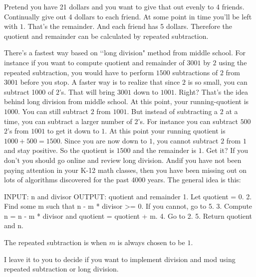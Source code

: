 Pretend you have 21 dollars and you want to give that out evenly to 4 friends.
Continually give out 4 dollars to each friend.
At some point in time you'll be left with $1$. That's the remainder.
And each friend has 5 dollars.
Therefore the quotient and remainder can be calculated
by repeated subtraction.

There's a fastest way based on \lq\lq long division" method from middle
school.
For instance if you want to compute quotient and remainder of
$3001$ by $2$ using the repeated subtraction, you would have to perform
$1500$ subtractions of $2$ from $3001$ before you stop.
A faster way is to realize that since $2$ is so small, you can
subtract 1000 of $2$'s.
That will bring $3001$ down to $1001$. Right?
That's the idea behind long division from middle school.
At this point, your running-quotient is $1000$.
You can still subtract $2$ from $1001$.
But instead of subtracting a $2$ at a time, you can subtract a larger
number of $2$'s.
For instance you can subtract $500$ $2$'s from $1001$
to get it down to $1$.
At this point your running quotient is $1000 + 500 = 1500$.
Since you are now down to $1$, you cannot subtract $2$ from $1$ and stay
positive.
So the quotient is $1500$ and the remainder is $1$.
Get it?
If you don't you should go online and review long division.
Andif you have not been paying attention in your K-12 math classes, then you
have been missing out on lots of algorithms discovered for the past 4000 years.
The general idea is this:
\begin{console}[fontsize=\footnotesize]
INPUT: n and divisor
OUTPUT: quotient and remainder
1. Let quotient = 0.
2. Find some m such that n - m * divisor >= 0. If you cannot, go to 5.
3. Compute n = n - m * divisor and quotient = quotient + m.
4. Go to 2.
5. Return quotient and n.
\end{console}
The repeated subtraction is when $m$ is always chosen to be $1$.

I leave it to you to decide if you want to implement division and mod using
repeated subtraction or long division.

